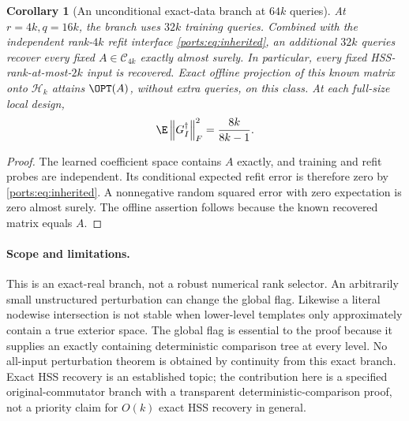 \documentclass[11pt,oneside,openany,a4paper]{book}
\numberwithin{equation}{chapter}
\newtheorem{corollary}[theorem]{Corollary}
\theoremstyle{definition}
\theoremstyle{remark}
\newcommand{\F}[1]{\left\lVert#1\right\rVert_F}
\newcommand{\HH}{\mathcal H}\newcommand{\SSS}{\mathcal S}
\begin{document}
\begin{corollary}[An unconditional exact-data branch at $64k$ queries]\label{ports:cor:exactquery}
At $r=4k,q=16k$, the branch uses $32k$ training queries. Combined with the independent rank-$4k$ refit interface \eqref{ports:eq:inherited}, an additional $32k$ queries recover every fixed $A\in\mathcal C_{4k}$ exactly almost surely. In particular, every fixed HSS-rank-at-most-$2k$ input is recovered. Exact offline projection of this known matrix onto $\HH_k$ attains $\OPT(A)$, without extra queries, on this class. At each full-size local design,
\[
 \E\F{G_I^\dagger}^2=\frac{8k}{8k-1}.
\]
\end{corollary}
\begin{proof}
The learned coefficient space contains $A$ exactly, and training and refit probes are independent. Its conditional expected refit error is therefore zero by \eqref{ports:eq:inherited}. A nonnegative random squared error with zero expectation is zero almost surely. The offline assertion follows because the known recovered matrix equals $A$.
\end{proof}

\paragraph{Scope and limitations.}
This is an exact-real branch, not a robust numerical rank selector. An arbitrarily small unstructured perturbation can change the global flag. Likewise a literal nodewise intersection is not stable when lower-level templates only approximately contain a true exterior space. The global flag is essential to the proof because it supplies an exactly containing deterministic comparison tree at every level. No all-input perturbation theorem is obtained by continuity from this exact branch. Exact HSS recovery is an established topic; the contribution here is a specified original-commutator branch with a transparent deterministic-comparison proof, not a priority claim for $O(k)$ exact HSS recovery in general.
\end{document}

